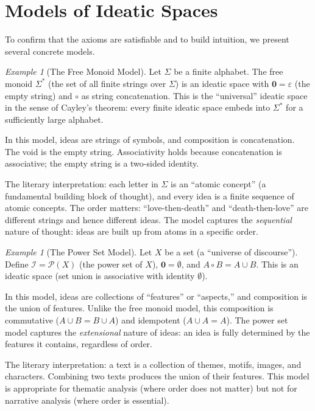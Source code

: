\documentclass[11pt,openany]{book}
\theoremstyle{definition}
\theoremstyle{plain}
\theoremstyle{remark}
\newtheorem{example}[axiom]{Example}
\newcommand{\IS}{\mathcal{I}}               %
\newcommand{\compose}{\circ}                 %
\newcommand{\void}{\mathbf{0}}              %
\begin{document}
\section{Models of Ideatic Spaces}

To confirm that the axioms are satisfiable and to build intuition, we present several concrete models.

\begin{example}[The Free Monoid Model]
Let $\Sigma$ be a finite alphabet. The free monoid $\Sigma^*$ (the set of all finite strings over $\Sigma$) is an ideatic space with $\void = \varepsilon$ (the empty string) and $\compose$ as string concatenation. This is the ``universal'' ideatic space in the sense of Cayley's theorem: every finite ideatic space embeds into $\Sigma^*$ for a sufficiently large alphabet.

In this model, ideas are strings of symbols, and composition is concatenation. The void is the empty string. Associativity holds because concatenation is associative; the empty string is a two-sided identity.

The literary interpretation: each letter in $\Sigma$ is an ``atomic concept'' (a fundamental building block of thought), and every idea is a finite sequence of atomic concepts. The order matters: ``love-then-death'' and ``death-then-love'' are different strings and hence different ideas. The model captures the \emph{sequential} nature of thought: ideas are built up from atoms in a specific order.
\end{example}

\begin{example}[The Power Set Model]
Let $X$ be a set (a ``universe of discourse''). Define $\IS = \mathcal{P}(X)$ (the power set of $X$), $\void = \emptyset$, and $A \compose B = A \cup B$. This is an ideatic space (set union is associative with identity $\emptyset$).

In this model, ideas are collections of ``features'' or ``aspects,'' and composition is the union of features. Unlike the free monoid model, this composition is commutative ($A \cup B = B \cup A$) and idempotent ($A \cup A = A$). The power set model captures the \emph{extensional} nature of ideas: an idea is fully determined by the features it contains, regardless of order.

The literary interpretation: a text is a collection of themes, motifs, images, and characters. Combining two texts produces the union of their features. This model is appropriate for thematic analysis (where order does not matter) but not for narrative analysis (where order is essential).
\end{example}
\end{document}
